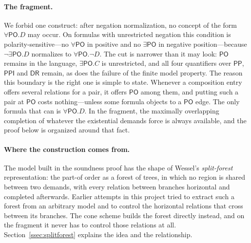 \documentclass[11pt]{article}
\newcommand{\DR}{\mathsf{DR}}
\newcommand{\PO}{\mathsf{PO}}
\newcommand{\PP}{\mathsf{PP}}
\newcommand{\PPI}{\mathsf{PPI}}
\theoremstyle{plain}
\theoremstyle{definition}
\begin{document}
\paragraph{The fragment.} We forbid one construct: after negation
normalization, no concept of the form $\forall\PO.D$ may occur. On formulas
with unrestricted negation this condition is polarity-sensitive---no
$\forall\PO$ in positive and no $\exists\PO$ in negative position---because
$\neg\exists\PO.D$ normalizes to $\forall\PO.\neg D$. The cut is narrower than
it may look: $\PO$ remains in the language, $\exists\PO.C$ is unrestricted, and
all four quantifiers over $\PP$, $\PPI$ and $\DR$ remain, as does the failure
of the finite model property. The reason this boundary is the right one is
simple to state. Whenever a composition entry offers several relations for a
pair, it offers $\PO$ among them, and putting such a pair at $\PO$ costs
nothing---unless some formula objects to a $\PO$ edge. The only formula that
can is $\forall\PO.D$. In the fragment, the maximally overlapping completion
of whatever the existential demands force is always available, and the proof
below is organized around that fact.

\paragraph{Where the construction comes from.} The model built in the
soundness proof has the shape of Wessel's \emph{split-forest} representation:
the part-of order as a forest of trees, in which no region is shared between
two demands, with every relation between branches horizontal and completed
afterwards. Earlier attempts in this project tried to extract such a forest
from an arbitrary model and to control the horizontal relations that cross
between its branches. The cone scheme builds the forest directly instead, and
on the fragment it never has to control those relations at all.
Section~\ref{ssec:splitforest} explains the idea and the relationship.
\end{document}
